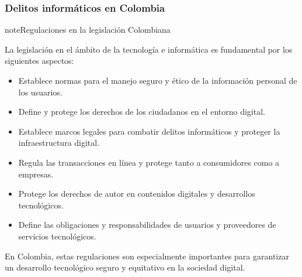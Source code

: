 \documentclass[letterpaper,10pt,spanish]{sphinxmanual}
\begin{document}
\subsubsection{Delitos informáticos en Colombia}
\label{\detokenize{1_guias/10informatica/G1003:delitos-informaticos-en-colombia}}
\begin{sphinxadmonition}{note}{Regulaciones en la legislación Colombiana}

\sphinxAtStartPar
La legislación en el ámbito de la tecnología e informática es fundamental por los siguientes aspectos:
\begin{itemize}
\item {} 
\sphinxAtStartPar
{} Establece normas para el manejo seguro y ético de la información personal de los usuarios.

\item {} 
\sphinxAtStartPar
{} Define y protege los derechos de los ciudadanos en el entorno digital.

\item {} 
\sphinxAtStartPar
{} Establece marcos legales para combatir delitos informáticos y proteger la infraestructura digital.

\item {} 
\sphinxAtStartPar
{} Regula las transacciones en línea y protege tanto a consumidores como a empresas.

\item {} 
\sphinxAtStartPar
{} Protege los derechos de autor en contenidos digitales y desarrollos tecnológicos.

\item {} 
\sphinxAtStartPar
{} Define las obligaciones y responsabilidades de usuarios y proveedores de servicios tecnológicos.

\end{itemize}

\sphinxAtStartPar
En Colombia, estas regulaciones son especialmente importantes para garantizar un desarrollo tecnológico seguro y equitativo en la sociedad digital.
\end{sphinxadmonition}
\end{document}
